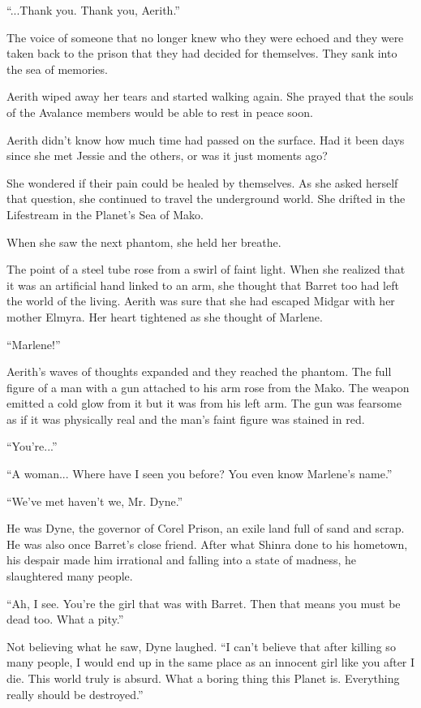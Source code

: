 \documentclass[oneside]{book}
\begin{document}
“...Thank you. Thank you, Aerith.”

The voice of someone that no longer knew who they were echoed and they were taken back to the prison that they had decided for themselves. They sank into the sea of memories.

Aerith wiped away her tears and started walking again. She prayed that the souls of the Avalance members would be able to rest in peace soon.

\newpage
Aerith didn't know how much time had passed on the surface. Had it been days since she met Jessie and the others, or was it just moments ago?

She wondered if their pain could be healed by themselves. As she asked herself that question, she continued to travel the underground world. She drifted in the Lifestream in the Planet's Sea of Mako.

When she saw the next phantom, she held her breathe.

The point of a steel tube rose from a swirl of faint light. When she realized that it was an artificial hand linked to an arm, she thought that Barret too had left the world of the living. Aerith was sure that she had escaped Midgar with her mother Elmyra. Her heart tightened as she thought of Marlene.

“Marlene!”

Aerith's waves of thoughts expanded and they reached the phantom. The full figure of a man with a gun attached to his arm rose from the Mako. The weapon emitted a cold glow from it but it was from his left arm. The gun was fearsome as if it was physically real and the man's faint figure was stained in red.

“You're...”

“A woman... Where have I seen you before? You even know Marlene's name.”

“We've met haven't we, Mr. Dyne.”

He was Dyne, the governor of Corel Prison, an exile land full of sand and scrap. He was also once Barret's close friend. After what Shinra done to his hometown, his despair made him irrational and falling into a state of madness, he slaughtered many people.

“Ah, I see. You're the girl that was with Barret. Then that means you must be dead too. What a pity.”

Not believing what he saw, Dyne laughed. “I can't believe that after killing so many people, I would end up in the same place as an innocent girl like you after I die. This world truly is absurd. What a boring thing this Planet is. Everything really should be destroyed.”
\end{document}
